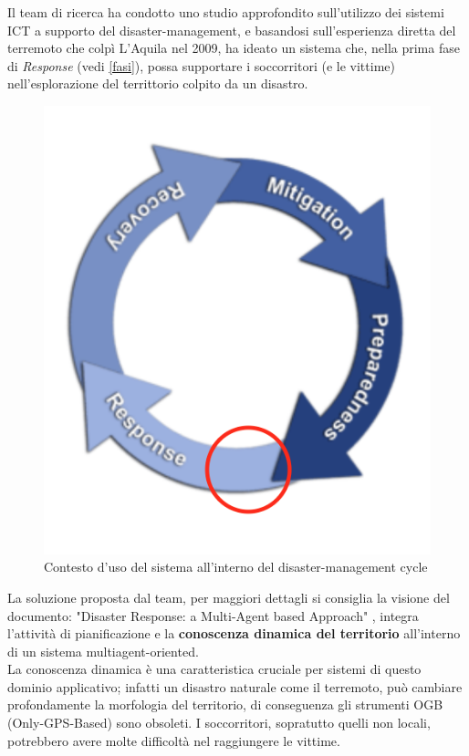 Il team di ricerca ha condotto uno studio approfondito sull'utilizzo dei sistemi ICT a supporto del disaster-management, e basandosi sull'esperienza diretta del terremoto che colpì L'Aquila nel 2009, ha ideato un sistema che, nella prima fase di \textit{Response} (vedi \ref{fasi}), possa supportare i  soccorritori (e le vittime) nell'esplorazione del territtorio colpito da un disastro. \\
\begin{figure}[H]
	\centering
	\includegraphics[scale=0.8]{ScenarioApplicativo/contesto.png}
	\caption{Contesto d'uso del sistema all'interno del disaster-management cycle}
	\label{fig:contesto}
\end{figure}
La soluzione proposta dal team, per maggiori dettagli si consiglia la visione del documento: "Disaster Response: a Multi-Agent based Approach" \cite{RESPONSE}, integra l'attività di pianificazione e la \textbf{conoscenza dinamica del territorio} all'interno di un sistema multiagent-oriented.\\
La conoscenza dinamica è una caratteristica cruciale per sistemi di questo dominio applicativo; infatti un disastro naturale come il terremoto, può cambiare profondamente la morfologia del territorio, di conseguenza gli strumenti OGB (Only-GPS-Based) sono obsoleti. I soccorritori, sopratutto quelli non locali, potrebbero avere molte difficoltà nel raggiungere le vittime.
